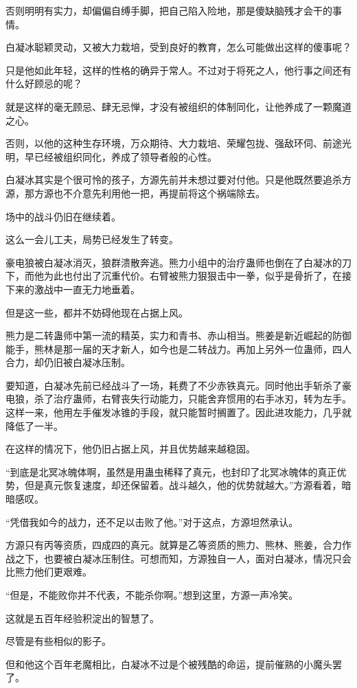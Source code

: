 \begin{this_body}
否则明明有实力，却偏偏自缚手脚，把自己陷入险地，那是傻缺脑残才会干的事情。

白凝冰聪颖灵动，又被大力栽培，受到良好的教育，怎么可能做出这样的傻事呢？

只是他如此年轻，这样的性格的确异于常人。不过对于将死之人，他行事之间还有什么好顾忌的呢？

就是这样的毫无顾忌、肆无忌惮，才没有被组织的体制同化，让他养成了一颗魔道之心。

否则，以他的这种生存环境，万众期待、大力栽培、荣耀包拢、强敌环伺、前途光明，早已经被组织同化，养成了领导者般的心性。

白凝冰其实是个很可怜的孩子，方源先前并未想过要对付他。只是他既然要追杀方源，那方源也不介意先利用他一把，再提前将这个祸端除去。

场中的战斗仍旧在继续着。

这么一会儿工夫，局势已经发生了转变。

豪电狼被白凝冰消灭，狼群溃散奔逃。熊力小组中的治疗蛊师也倒在了白凝冰的刀下，而他为此也付出了沉重代价。右臂被熊力狠狠击中一拳，似乎是骨折了，在接下来的激战中一直无力地垂着。

但是这一些，都并不妨碍他现在占据上风。

熊力是二转蛊师中第一流的精英，实力和青书、赤山相当。熊姜是新近崛起的防御能手，熊林是那一届的天才新人，如今也是二转战力。再加上另外一位蛊师，四人合力，却仍旧被白凝冰压制。

要知道，白凝冰先前已经战斗了一场，耗费了不少赤铁真元。同时他出手斩杀了豪电狼，杀了治疗蛊师，右臂丧失行动能力，只能舍弃惯用的右手冰刃，转为左手。这样一来，他用左手催发冰锥的手段，就只能暂时搁置了。因此进攻能力，几乎就降低了一半。

在这样的情况下，他仍旧占据上风，并且优势越来越稳固。

“到底是北冥冰魄体啊，虽然是用蛊虫稀释了真元，也封印了北冥冰魄体的真正优势，但是真元恢复速度，却还保留着。战斗越久，他的优势就越大。”方源看着，暗暗感叹。

“凭借我如今的战力，还不足以击败了他。”对于这点，方源坦然承认。

方源只有丙等资质，四成四的真元。就算是乙等资质的熊力、熊林、熊姜，合力作战之下，也要被白凝冰压制住。可想而知，方源独自一人，面对白凝冰，情况只会比熊力他们更艰难。

“但是，不能败你并不代表，不能杀你啊。”想到这里，方源一声冷笑。

这就是五百年经验积淀出的智慧了。

尽管是有些相似的影子。

但和他这个百年老魔相比，白凝冰不过是个被残酷的命运，提前催熟的小魔头罢了。

\end{this_body}


